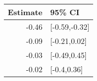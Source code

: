 \begin{tabular}{rl}
  \hline
Estimate & 95\% CI \\ 
  \hline
-0.46 & [-0.59,-0.32] \\ 
  -0.09 & [-0.21,0.02] \\ 
  -0.03 & [-0.49,0.45] \\ 
  -0.02 & [-0.4,0.36] \\ 
   \hline
\end{tabular}

